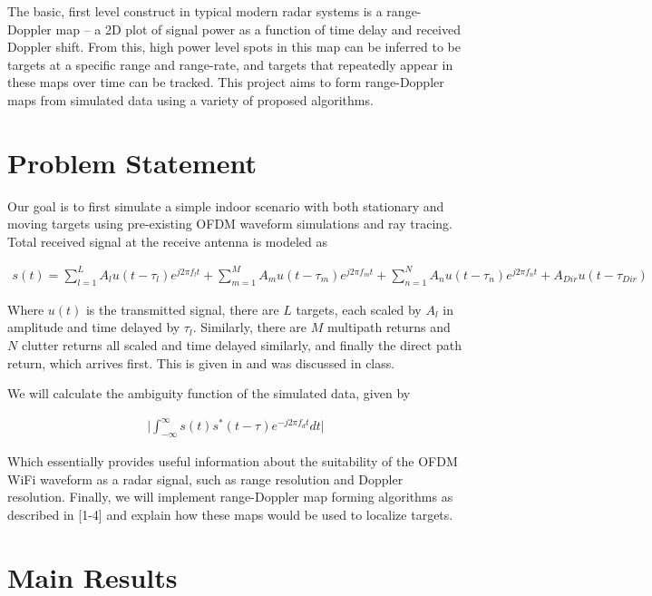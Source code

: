 \documentclass[article,11pt,onecolumn,final]{IEEEtran}
\begin{document}
The basic, first level construct in typical modern radar systems is a range-Doppler map – a 2D plot of
signal power as a function of time delay and received Doppler shift. From this, high power level spots in
this map can be inferred to be targets at a specific range and range-rate, and targets that repeatedly
appear in these maps over time can be tracked. This project aims to form range-Doppler maps from
simulated data using a variety of proposed algorithms.

\section{Problem Statement} 
Our goal is to first simulate a simple indoor scenario with both stationary and moving targets using 
pre-existing OFDM waveform simulations and ray tracing. Total received signal at the receive antenna is modeled as

\begin{align*}
 s(t) = \sum_{l=1}^L A_l u(t-\tau_l)e^{j 2 \pi f_l t} + \sum_{m=1}^M A_m u(t-\tau_m)e^{j 2\pi f_m t} +
        \sum_{n=1}^N A_n u(t-\tau_n)e^{j 2 \pi f_n t} + A_{Dir} u(t-\tau_{Dir})
\end{align*}

Where $u(t)$ is the transmitted signal, there are $L$ targets, each scaled by $A_l$ in amplitude and time
delayed by $\tau_l$. Similarly, there are $M$ multipath returns and $N$ clutter returns all scaled and time delayed similarly, and finally the direct path return, which arrives first. This is given in \cite{Chetty} and was discussed in class.

We will calculate the ambiguity function of the simulated data, given by

\begin{align*}
\big|\int_{-\infty}^{\infty} s(t)s^*(t-\tau)e^{-j2\pi f_d t}dt \big|
\end{align*}

Which essentially provides useful information about the suitability of the OFDM WiFi waveform as a
radar signal, such as range resolution and Doppler resolution. Finally, we will implement range-Doppler
map forming algorithms as described in [1-4] and explain how these maps would be used to localize
targets.


\section{Main Results}
\end{document}
